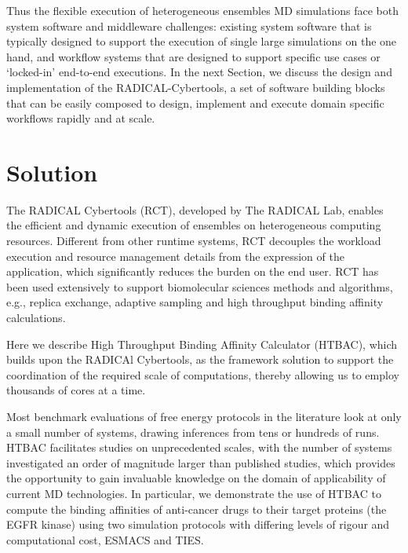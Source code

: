 \documentclass[conference]{IEEEtran}
\begin{document}

Thus the flexible execution of heterogeneous ensembles MD simulations face
both system software and middleware challenges: existing system software that
is typically designed to support the execution of single large simulations on
the one hand, and workflow systems that are designed to support specific use
cases or `locked-in' end-to-end executions. In the next Section, we discuss
the design and implementation of the RADICAL-Cybertools, a set of software
building blocks that can be easily composed to design, implement and execute
domain specific workflows rapidly and at scale.

\section{Solution}\label{sec:solution}

The RADICAL Cybertools (RCT), developed by The RADICAL Lab, enables the 
efficient and dynamic execution of ensembles on heterogeneous computing 
resources. Different from other runtime systems, RCT decouples the workload 
execution and resource management details from the expression of the 
application, which significantly reduces the burden on the end user. 
RCT has been used extensively to support 
biomolecular sciences methods and algorithms, e.g., replica exchange, adaptive
sampling and high throughput binding affinity calculations. 

Here we describe High Throughput Binding Affinity Calculator (HTBAC), 
which builds upon the RADICAl Cybertools, as the framework solution to support 
the coordination of the required scale of computations, thereby 
allowing us to employ thousands of cores at a time.

Most benchmark evaluations of free energy protocols in the literature look 
at only a small number of systems, drawing inferences from tens or hundreds 
of runs. HTBAC facilitates studies on unprecedented scales, with the number 
of systems investigated an order of magnitude larger than published studies, 
which provides the opportunity to gain invaluable knowledge on the domain of 
applicability of current MD technologies. In particular, we demonstrate the 
use of HTBAC to compute the binding affinities of anti-cancer drugs to their 
target proteins (the EGFR kinase) using two simulation protocols with differing 
levels of rigour and computational cost, ESMACS and TIES.
\end{document}
